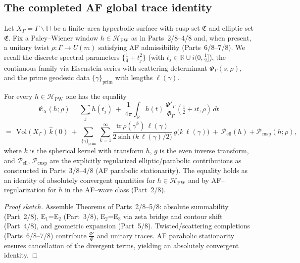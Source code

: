 \subsection{The completed AF global trace identity}
\label{subsec:af-completed}
\relax\hspace{0pt}

Let $X_\Gamma=\Gamma\backslash\mathbb{H}$ be a finite–area hyperbolic surface with cusp set $\mathfrak{C}$ and elliptic set $\mathfrak{E}$. Fix a Paley–Wiener window $h\in \mathcal{H}_{\mathrm{PW}}$ as in Parts~2/8–4/8 and, when present, a unitary twist $\rho:\Gamma\to U(m)$ satisfying AF admissibility (Parts~6/8–7/8). We recall the discrete spectral parameters $\{\tfrac14+t_j^2\}$ (with $t_j\in\mathbb{R}\cup i(0,\tfrac12]$), the continuous family via Eisenstein series with scattering determinant $\Phi_\Gamma(s,\rho)$, and the prime geodesic data $\{\gamma\}_{\mathrm{prim}}$ with lengths $\ell(\gamma)$.

\begin{theorem}
\label{thm:AF-CTI}
For every $h\in\mathcal{H}_{\mathrm{PW}}$ one has the equality
\begin{equation}\label{eq:AF-CTI}
\boxed{\;
\mathfrak{E}_X(h;\rho)
=
\sum_j h(t_j)\ +\ \frac{1}{4\pi}\int_{\mathbb{R}} h(t)\,\frac{\Phi'_\Gamma}{\Phi_\Gamma}\!\left(\tfrac12+it,\rho\right)\,dt
\;}
\end{equation}
\[
=\ \ \mathrm{Vol}(X_\Gamma)\, \widehat{k}(0)
\ +\ \sum_{\{\gamma\}_{\mathrm{prim}}}\ \sum_{k=1}^\infty
\frac{\mathrm{tr}\,\rho(\gamma^k)\, \ell(\gamma)}{2\sinh\!\big(k\,\ell(\gamma)/2\big)}\, g\!\big(k\,\ell(\gamma)\big)
\ +\ \mathcal{P}_{\mathrm{ell}}(h)+\mathcal{P}_{\mathrm{cusp}}(h;\rho),
\]
where $k$ is the spherical kernel with transform $h$, $g$ is the even inverse transform, and $\mathcal{P}_{\mathrm{ell}}$, $\mathcal{P}_{\mathrm{cusp}}$ are the explicitly regularized elliptic/parabolic contributions as constructed in Parts~3/8–4/8 (AF parabolic stationarity). The equality holds as an identity of absolutely convergent quantities for $h\in\mathcal{H}_{\mathrm{PW}}$ and by AF–regularization for $h$ in the AF–wave class (Part~2/8).
\end{theorem}

\begin{proof}[Proof sketch]
Assemble Theorems of Parts~2/8–5/8: absolute summability (Part~2/8), E$_1$=E$_2$ (Part~3/8), E$_2$=E$_3$ via zeta bridge and contour shift (Part~4/8), and geometric expansion (Part~5/8). Twisted/scattering completions (Parts~6/8–7/8) contribute $\frac{\Phi'}{\Phi}$ and unitary traces. AF parabolic stationarity ensures cancellation of the divergent terms, yielding an absolutely convergent identity. \relax\hspace{0pt} %
\end{proof}


